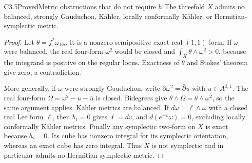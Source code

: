 \begin{claim}{C3.5}{Proved}{Metric obstructions that do not require $h$}
The threefold $X$ admits no balanced, strongly Gauduchon, K\"ahler,
locally conformally K\"ahler, or Hermitian-symplectic metric.
\end{claim}
\begin{proof}
Let $\theta=f^*\omega_{FS}$.  It is a nonzero semipositive exact
real $(1,1)$ form.  If $\omega$ were balanced, the real four-form
$\omega^2$ would be closed and
$\int_X\theta\wedge\omega^2>0$, because the integrand is positive
on the regular locus.  Exactness of $\theta$ and Stokes' theorem
give zero, a contradiction.

More generally, if $\omega$ were strongly Gauduchon, write
$\partial\omega^2=\bar\partial u$ with $u\in A^{3,1}$.
The real four-form $\Omega=\omega^2-u-\bar u$ is closed.
Bidegrees give $\theta\wedge\Omega=\theta\wedge\omega^2$,
so the same argument applies.  K\"ahler metrics are balanced.
If $d\omega=\ell\wedge\omega$ with a closed real Lee form
$\ell$, then $b_1=0$ gives $\ell=dv$, and
$d(e^{-v}\omega)=0$, excluding locally conformally K\"ahler metrics.
Finally any symplectic two-form on $X$ is exact because $b_2=0$.
Its cube has nonzero integral for its symplectic orientation, whereas
an exact cube has zero integral.  Thus $X$ is not symplectic and in
particular admits no Hermitian-symplectic metric.
\end{proof}

